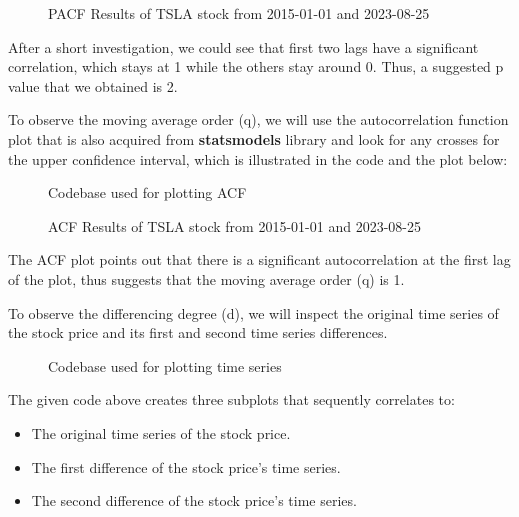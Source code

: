 \documentclass[11pt]{article}
\begin{document}
\begin{figure}[ht]
    \centering
    \caption{PACF Results of TSLA stock from 2015-01-01 and 2023-08-25}
    \label{fig:pacf_results}
\end{figure}

After a short investigation, we could see that first two lags have a significant correlation, which stays at 1 while the others stay around 0. Thus, a suggested p value that we obtained is 2.

To observe the moving average order (q), we will use the autocorrelation function plot that is also acquired from \textbf{statsmodels} library and look for any crosses for the upper confidence interval, which is illustrated in the code and the plot below:

\begin{figure}[ht]
    \centering
    \caption{Codebase used for plotting ACF}
    \label{fig:acf_code}
\end{figure}

\begin{figure}[ht]
    \centering
    \caption{ACF Results of TSLA stock from 2015-01-01 and 2023-08-25}
    \label{fig:acf_results}
\end{figure}

The ACF plot points out that there is a significant autocorrelation at the first lag of the plot, thus suggests that the moving average order (q) is 1.

To observe the differencing degree (d), we will inspect the original time series of the stock price and its first and second time series differences.

\begin{figure}[ht]
    \centering
    \caption{Codebase used for plotting time series}
    \label{fig:time_series_code}
\end{figure}

The given code above creates three subplots that sequently correlates to:
\begin{itemize}
    \item The original time series of the stock price.
    \item The first difference of the stock price's time series.
    \item The second difference of the stock price's time series.
\end{itemize}
\end{document}
